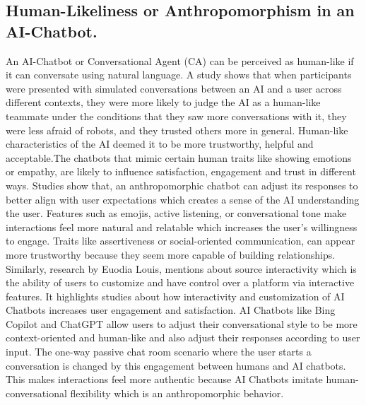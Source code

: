 \documentclass[conference]{IEEEtran}
\begin{document}
\subsection{Human-Likeliness or Anthropomorphism in an AI-Chatbot.}
An AI-Chatbot or Conversational Agent (CA) can be perceived as human-like if it can conversate using natural language. A study shows that when participants were presented with simulated conversations between an AI and a user across different contexts, they were more likely to judge the AI as a human-like teammate under the conditions that they saw more conversations with it, they were less afraid of robots, and they trusted others more in general. Human-like characteristics of the AI deemed it to be more trustworthy, helpful and acceptable\cite{b5}.The chatbots that mimic certain human traits like showing emotions or empathy, are likely to influence satisfaction, engagement and trust in different ways. Studies show that, an anthropomorphic chatbot can adjust its responses to better align with user expectations which creates a sense of the AI understanding the user. Features such as emojis, active listening, or conversational tone make interactions feel more natural and relatable which increases the user’s willingness to engage. Traits like assertiveness or social-oriented communication, can appear more trustworthy because they seem more capable of building relationships\cite{b6}\cite{b7}\cite{b8}. Similarly, research by Euodia Louis\cite{b9}, mentions about source interactivity which is the ability of users to customize and have control over a platform via interactive features. It highlights studies about how interactivity and customization of AI Chatbots increases user engagement and satisfaction. AI Chatbots like Bing Copilot and ChatGPT allow users to adjust their conversational style to be more context-oriented and human-like and also adjust their responses according to user input. The one-way passive chat room scenario where the user starts a conversation is changed by this engagement between humans and AI chatbots. This makes interactions feel more authentic because AI Chatbots imitate human-conversational flexibility which is an anthropomorphic behavior.
\end{document}
